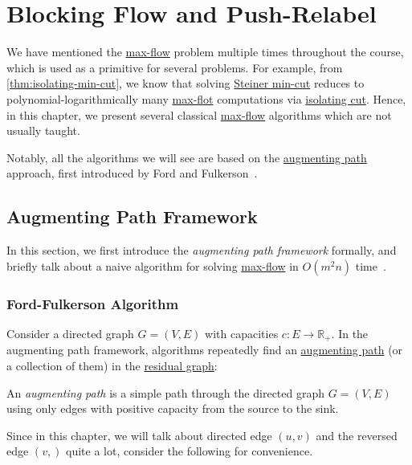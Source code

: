 \chapter{Blocking Flow and Push-Relabel}
We have mentioned the \hyperref[prb:s-t-max-flow]{max-flow} problem multiple times throughout the course, which is used as a primitive for several problems. For example, from \autoref{thm:isolating-min-cut}, we know that solving \hyperref[prb:Steiner-min-cut]{Steiner min-cut} reduces to polynomial-logarithmically many \hyperref[prb:s-t-max-flow]{max-flot} computations via \hyperref[prb:isolating-cut]{isolating cut}. Hence, in this chapter, we present several classical \hyperref[prb:s-t-max-flow]{max-flow} algorithms which are not usually taught.

Notably, all the algorithms we will see are based on the \hyperref[def:augmenting-path]{augmenting path} approach, first introduced by Ford and Fulkerson~\cite{ford1956maximal}.

\section{Augmenting Path Framework}
In this section, we first introduce the \emph{augmenting path framework} formally, and briefly talk about a naive algorithm for solving \hyperref[prb:s-t-max-flow]{max-flow} in \(O(m^2 n)\) time~\cite{dinic1970algorithm,edmonds1972theoretical}.

\subsection{Ford-Fulkerson Algorithm}
Consider a directed graph \(G = (V, E)\) with capacities \(c \colon E \to \mathbb{R} _{+}\). In the augmenting path framework, algorithms repeatedly find an \hyperref[def:augmenting-path]{augmenting path} (or a collection of them) in the \hyperref[def:residual-graph]{residual graph}:

\begin{definition}\label{def:augmenting-path}
	An \emph{augmenting path} is a simple path through the directed graph \(G = (V, E)\) using only edges with positive capacity from the source to the sink.
\end{definition}

Since in this chapter, we will talk about directed edge \((u, v)\) and the reversed edge \((v, )\) quite a lot, consider the following for convenience.

